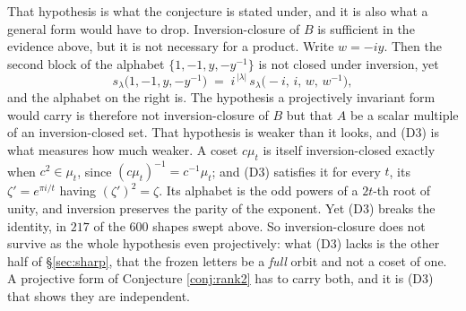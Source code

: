 \documentclass[11pt,reqno]{amsart}
\theoremstyle{plain}
\theoremstyle{definition}
\newcommand{\zt}{\mu_t}
\begin{document}
That hypothesis is what the conjecture is stated under, and it is also what a general form would have
to drop. Inversion-closure of $B$ is sufficient in the evidence above, but it is not necessary for a
product. Write $w=-iy$. Then the second block of
the alphabet $\{1,-1,y,-y^{-1}\}$ is not closed under inversion, yet
\begin{equation}\label{eq:scalar}
s_\lambda\big(1,-1,y,-y^{-1}\big)\;=\;i^{\,|\lambda|}\,s_\lambda\big(-i,\,i,\,w,\,w^{-1}\big),
\end{equation}
and the alphabet on the right is. The hypothesis a projectively invariant form would carry is therefore not inversion-closure of $B$
but that $A$ be a scalar multiple of an inversion-closed set. That hypothesis is weaker than it
looks, and (D3) is what measures how much weaker. A coset $c\zt$ is itself inversion-closed exactly
when $c^{2}\in\zt$, since $(c\zt)^{-1}=c^{-1}\zt$; and (D3) satisfies it for every $t$, its
$\zeta'=e^{\pi i/t}$ having $(\zeta')^{2}=\zeta$. Its alphabet is the odd powers of a $2t$-th root of
unity, and inversion preserves the parity of the exponent. Yet (D3) breaks the identity, in $217$ of
the $600$ shapes swept above. So inversion-closure does not survive as the whole hypothesis even
projectively: what (D3) lacks is the other half of \S\ref{sec:sharp}, that the frozen letters be a
\emph{full} orbit and not a coset of one. A projective form of Conjecture \ref{conj:rank2} has to
carry both, and it is (D3) that shows they are independent.
\end{document}
